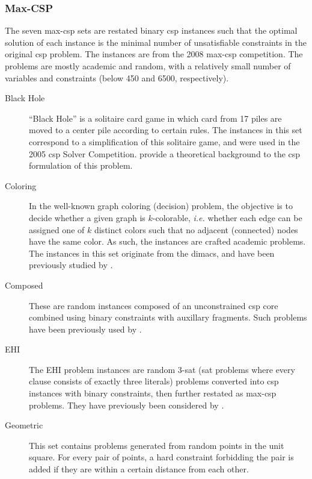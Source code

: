 \subsubsection{Max-CSP}
The seven max-\gls{csp} sets are restated binary \gls{csp} instances such that the optimal solution of each instance is the minimal number of unsatisfiable constraints in the original \gls{csp} problem.
The instances are from the 2008 max-\gls{csp} competition.
The problems are mostly academic and random, with a relatively small number of variables and constraints (below \num{450} and \num{6500}, respectively).

\begin{description}
	\item[Black Hole]
		\enquote{Black Hole} is a solitaire card game in which card from 17 piles are moved to a center pile according to certain rules.
		The instances in this set correspond to a simplification of this solitaire game, and were used in the 2005 \gls{csp} Solver Competition.
		\Textcite{Gent07} provide a theoretical background to the \gls{csp} formulation of this problem.
	\item[Coloring]
		In the well-known graph coloring (decision) problem, the objective is to decide whether a given graph is \(k\)-colorable, \emph{i.e.} whether each edge can be assigned one of \(k\) distinct colors such that no adjacent (connected) nodes have the same color.
		As such, the instances are crafted academic problems.
		The instances in this set originate from the \gls{dimacs}, and have been previously studied by \textcite{Benhamou07}.
	\item[Composed]
		These are random instances composed of an unconstrained \gls{csp} core combined using binary constraints with auxillary fragments.
		Such problems have been previously used by \textcite{Lecoutre04,Jussien00}.
	\item[EHI]
		The EHI problem instances are random 3-\gls{sat} (\gls{sat} problems where every clause consists of exactly three literals) problems converted into \gls{csp} instances with binary constraints, then further restated as max-\gls{csp} problems. They have previously been considered by \textcite{Lecoutre04}.
	\item[Geometric]
		This set contains problems generated from random points in the unit square. For every pair of points, a hard constraint forbidding the pair is added if they are within a certain distance from each other.

\end{description}
